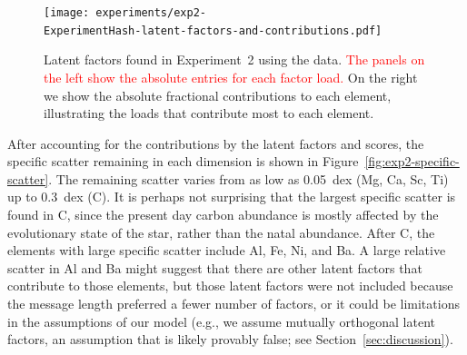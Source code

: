 \documentclass[twocolumn]{aastex62}
\newcommand{\todo}[1]{\textcolor{red}{#1}}
\newcommand{\ExperimentHash}{96ff8}
\begin{document}

\begin{figure}
	\texttt{[image: experiments/exp2-\\ExperimentHash-latent-factors-and-contributions.pdf]}
	\caption{Latent factors found in Experiment~2 using the \citet{Barklem:2005}
			 data. \todo{The panels on the left show the absolute entries for each factor load.} 
			 On the right we show the absolute fractional contributions to
			 each element, illustrating the loads that contribute most to each element.}
    \label{fig:exp2-factor-loads}
\end{figure}



After accounting for the contributions by the latent factors and scores,
the specific scatter remaining in each dimension is shown in
Figure~\ref{fig:exp2-specific-scatter}. The remaining scatter varies from as low 
as 0.05~dex (Mg, Ca, Sc, Ti) up to 0.3~dex (C). It is perhaps not surprising that
the largest specific scatter is found in C, since the present day carbon abundance
is mostly affected by the evolutionary state of the star, rather than the natal
abundance. After C, the elements with large specific scatter include Al, Fe, Ni, 
and Ba. A large relative scatter in Al and Ba might suggest that there are other latent
factors that contribute to those elements, but those latent factors were not included because
the message length preferred a fewer number of factors, or it could be limitations in
the assumptions of our model (e.g., we assume mutually orthogonal latent factors, an assumption that is likely provably false; see Section~\ref{sec:discussion}).
\end{document}
